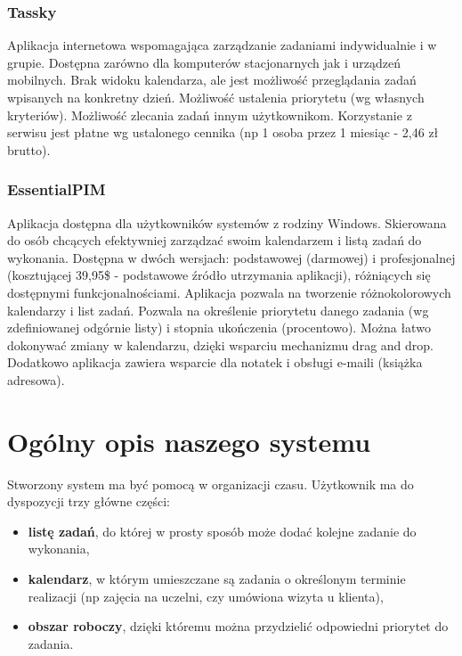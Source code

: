 \documentclass[pdflatex,11pt]{aghdpl}
\begin{document}
\subsection{Tassky}

Aplikacja internetowa wspomagająca zarządzanie zadaniami indywidualnie i w grupie. Dostępna zarówno dla komputerów stacjonarnych jak i urządzeń mobilnych. Brak widoku kalendarza, ale jest możliwość przeglądania zadań wpisanych na konkretny dzień. Możliwość ustalenia priorytetu (wg własnych kryteriów). Możliwość zlecania zadań innym użytkownikom. Korzystanie z serwisu jest płatne wg ustalonego cennika (np 1 osoba przez 1 miesiąc - 2,46 zł brutto).

\subsection{EssentialPIM}
Aplikacja dostępna dla użytkowników systemów z rodziny Windows. Skierowana do osób chcących efektywniej zarządzać swoim kalendarzem i listą zadań do wykonania. Dostępna w dwóch wersjach: podstawowej (darmowej) i profesjonalnej (kosztującej 39,95\$ - podstawowe źródło utrzymania aplikacji), różniących się dostępnymi funkcjonalnościami. Aplikacja pozwala na tworzenie różnokolorowych kalendarzy i list zadań. Pozwala na określenie priorytetu danego zadania (wg zdefiniowanej odgórnie listy) i stopnia ukończenia (procentowo). Można łatwo dokonywać zmiany w kalendarzu, dzięki wsparciu mechanizmu drag and drop. Dodatkowo aplikacja zawiera wsparcie dla notatek i obsługi e-maili (książka adresowa).



\chapter{Ogólny opis naszego systemu}

Stworzony system ma być pomocą w organizacji czasu. Użytkownik ma do dyspozycji trzy główne części:
\begin{itemize}
\item \textbf{listę zadań}, do której w prosty sposób może dodać kolejne zadanie do wykonania,
\item \textbf{kalendarz}, w którym umieszczane są zadania o określonym terminie realizacji (np zajęcia na uczelni, czy umówiona wizyta u klienta),
\item \textbf{obszar roboczy}, dzięki któremu można przydzielić odpowiedni priorytet do zadania.
\end{itemize}
\end{document}
